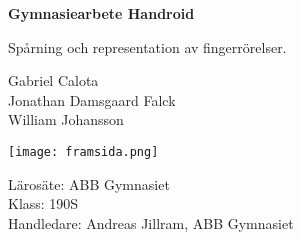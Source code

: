 \begin{titlepage}
    \centering

    \vspace*{1cm}

    \begin{LARGE}
        \textbf{Gymnasiearbete Handroid}
    \end{LARGE}

    \begin{Large}
    
        \vspace{1cm}

        Spårning och representation av fingerrörelser. 

    \end{Large}
    
\vspace{1cm}

    \begin{large}
        Gabriel Calota\\
        Jonathan Damsgaard Falck\\
        William Johansson
    \end{large}

    \vspace{1cm}


    \texttt{[image: framsida.png]}
    \vfill

    \begin{large}
        Lärosäte: ABB Gymnasiet\\
        \vspace{0.5cm}
        Klass: 190S\\
        \vspace{0.5cm}
        Handledare: Andreas Jillram, ABB Gymnasiet
    \end{large}

\end{titlepage}